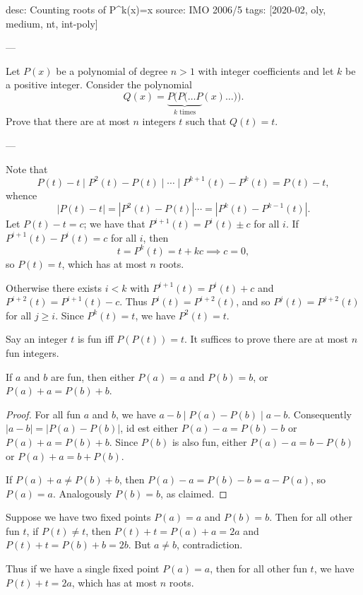 desc: Counting roots of P^k(x)=x
source: IMO 2006/5
tags: [2020-02, oly, medium, nt, int-poly]

---

Let $P(x)$ be a polynomial of degree $n>1$ with integer coefficients and let $k$ be a positive integer. Consider the polynomial \[Q(x)=\underbrace{P(P(\ldots P}_{k\text{ times}}(x)\ldots)).\]
Prove that there are at most $n$ integers $t$ such that $Q(t)=t$.

---

Note that \[P(t)-t\mid P^2(t)-P(t)\mid\cdots\mid P^{k+1}(t)-P^k(t)=P(t)-t,\]
whence \[|P(t)-t|=|P^2(t)-P(t)|\cdots=|P^k(t)-P^{k-1}(t)|.\]
Let $P(t)-t=c$; we have that $P^{i+1}(t)=P^i(t)\pm c$ for all $i$. If $P^{i+1}(t)-P^i(t)=c$ for all $i$, then \[t=P^k(t)=t+kc\implies c=0,\]
so $P(t)=t$, which has at most $n$ roots.

Otherwise there exists $i<k$ with $P^{i+1}(t)=P^i(t)+c$ and $P^{i+2}(t)=P^{i+1}(t)-c$. Thus $P^i(t)=P^{i+2}(t)$, and so $P^j(t)=P^{j+2}(t)$ for all $j\ge i$. Since $P^k(t)=t$, we have $P^2(t)=t$.

Say an integer $t$ is fun iff $P(P(t))=t$. It suffices to prove there are at most $n$ fun integers.
\begin{claim*}
    If $a$ and $b$ are fun, then either $P(a)=a$ and $P(b)=b$, or $P(a)+a=P(b)+b$.
\end{claim*}
\begin{proof}
    For all fun $a$ and $b$, we have $a-b\mid P(a)-P(b)\mid a-b$. Consequently $|a-b|=|P(a)-P(b)|$, id est either $P(a)-a=P(b)-b$ or $P(a)+a=P(b)+b$. Since $P(b)$ is also fun, either $P(a)-a=b-P(b)$ or $P(a)+a=b+P(b)$.

    If $P(a)+a\ne P(b)+b$, then $P(a)-a=P(b)-b=a-P(a)$, so $P(a)=a$. Analogously $P(b)=b$, as claimed.
\end{proof}

Suppose we have two fixed points $P(a)=a$ and $P(b)=b$. Then for all other fun $t$, if $P(t)\ne t$, then $P(t)+t=P(a)+a=2a$ and $P(t)+t=P(b)+b=2b$. But $a\ne b$, contradiction.

Thus if we have a single fixed point $P(a)=a$, then for all other fun $t$, we have $P(t)+t=2a$, which has at most $n$ roots.
